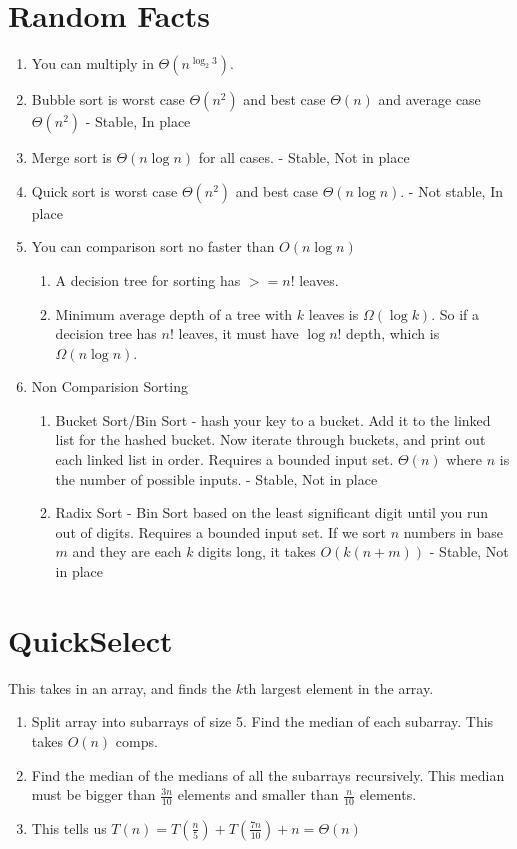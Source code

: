 \documentclass[12pt,twocolumn]{article}
\begin{document}
\section{Random Facts}
\begin{enumerate}
    \item You can multiply in $\Theta(n^{\log_2 3})$.
    \item Bubble sort is worst case $\Theta(n^2)$ and best case $\Theta(n)$ and average case $\Theta(n^2)$ - Stable, In place
    \item Merge sort is $\Theta(n \log n)$ for all cases. - Stable, Not in place
    \item Quick sort is worst case $\Theta(n^2)$ and best case $\Theta(n \log n)$. - Not stable, In place
    \item You can comparison sort no faster than $O(n \log n)$
        \begin{enumerate}
            \item A decision tree for sorting has $>= n!$ leaves.
            \item Minimum average depth of a tree with $k$ leaves is $\Omega(\log k)$. So if a decision tree has $n!$ leaves, it must have $\log n!$ depth, which is $\Omega(n \log n)$.
        \end{enumerate}
    \item Non Comparision Sorting
        \begin{enumerate}
            \item Bucket Sort/Bin Sort - hash your key to a bucket. Add it to the linked list for the hashed bucket. Now iterate through buckets, and print out each linked list in order. Requires a bounded input set. $\Theta(n)$ where $n$ is the number of possible inputs. - Stable, Not in place
            \item Radix Sort - Bin Sort based on the least significant digit until you run out of digits. Requires a bounded input set. If we sort $n$ numbers in base $m$ and they are each $k$ digits long, it takes $O(k(n + m))$ - Stable, Not in place
        \end{enumerate}
\end{enumerate}

\section{QuickSelect}
This takes in an array, and finds the $k$th largest element in the array.
\begin{enumerate}
    \item Split array into subarrays of size 5. Find the median of each subarray. This takes $O(n)$ comps.
    \item Find the median of the medians of all the subarrays recursively. This median must be bigger than $\frac{3n}{10}$ elements and smaller than $\frac{n}{10}$ elements.
    \item This tells us $T(n) = T(\frac{n}{5}) + T(\frac{7n}{10}) + n = \Theta(n)$
\end{enumerate}
\end{document}

